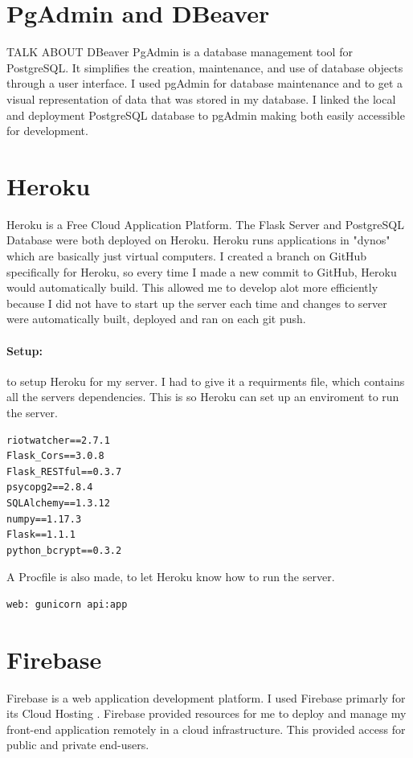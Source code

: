 \section{PgAdmin and DBeaver}
TALK ABOUT DBeaver
PgAdmin \cite{pgadmin} is a database management tool for PostgreSQL. It simplifies the creation, maintenance, and use of database objects through a user interface. I used pgAdmin for database maintenance and to get a visual representation of data that was stored in my database. I linked the local and deployment PostgreSQL database to pgAdmin making both easily accessible for development.
\section{Heroku}
Heroku \cite{heroku} is a Free Cloud Application Platform. The Flask Server and PostgreSQL Database were both deployed on Heroku. Heroku runs applications in "dynos" which are basically just virtual computers. I created a branch on GitHub specifically for Heroku, so every time I made a new commit to GitHub, Heroku would automatically build. This allowed me to develop alot more efficiently because I did not have to start up the server each time and changes to server were automatically built, deployed and ran on each git push. 
\paragraph{Setup:} to setup Heroku for my server. I had to give it a requirments file, which contains all the servers dependencies. This is so Heroku can set up an enviroment to run the server.
\begin{verbatim}
riotwatcher==2.7.1
Flask_Cors==3.0.8
Flask_RESTful==0.3.7
psycopg2==2.8.4
SQLAlchemy==1.3.12
numpy==1.17.3
Flask==1.1.1
python_bcrypt==0.3.2
\end{verbatim}
A Procfile is also made, to let Heroku know how to run the server.
\begin{verbatim}
web: gunicorn api:app
\end{verbatim}
\newpage
\section{Firebase}
Firebase \cite{firebase} is a web application development platform. I used Firebase primarly for its Cloud Hosting \cite{peteva2017cloud}. Firebase provided resources for me to deploy and manage my front-end application remotely in a cloud infrastructure. This provided access for public and private end-users.
